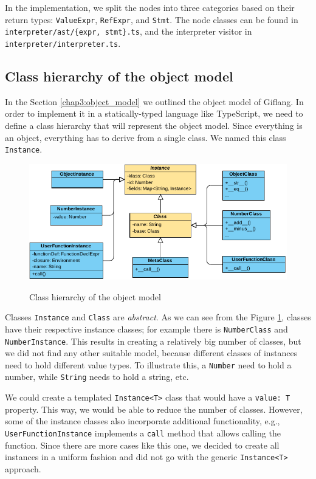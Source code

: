In the implementation, we split the nodes into three categories based on their return types: \texttt{ValueExpr}, \texttt{RefExpr}, and \texttt{Stmt}.
The node classes can be found in \texttt{interpreter/ast/\{expr, stmt\}.ts}, and the interpreter visitor in \texttt{interpreter/interpreter.ts}. 

\subsection{Class hierarchy of the object model}
In the Section \ref{chap3:object_model} we outlined the object model of Giflang. In order to implement it in a statically-typed language like TypeScript, we
need to define a class hierarchy that will represent the object model. Since everything is an object, everything has to derive from a single class. We named
this class \texttt{Instance}.
\begin{figure}[!hbt]
	\includegraphics[width=1\textwidth]{../img/class_hierarchy}
	\label{fig:chap4:class_hierarchy}
    \caption{Class hierarchy of the object model}
\end{figure}

Classes \texttt{Instance} and \texttt{Class} are \emph{abstract}. As we can see from the Figure \ref{fig:chap4:class_hierarchy}, classes have their
respective instance classes; for example there is \texttt{NumberClass} and \texttt{NumberInstance}. This results in creating a relatively big number
of classes, but we did not find any other suitable model, because different classes of instances need to hold different value types. To illustrate this,
a \texttt{Number} need to hold a number, while \texttt{String} needs to hold a string, etc.

We could create a templated \texttt{Instance<T>} class that would have a \texttt{value: T} property. This way, we would be able to reduce the number of
classes. However, some of the instance classes also incorporate additional functionality, e.g., \texttt{UserFunctionInstance} implements a \texttt{call} method
that allows calling the function. Since there are more cases like this one, we decided to create all instances in a uniform fashion and did not go with the
generic \texttt{Instance<T>} approach.

